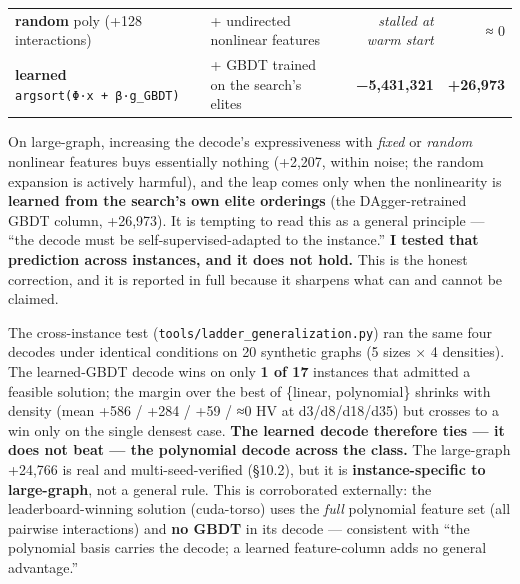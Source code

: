 \documentclass[
  11pt,
]{article}
\begin{document}
\begin{longtable}[]{@{}llrr@{}}
\begin{minipage}[t]{0.19\columnwidth}
\textbf{random} poly (+128 interactions)\strut
\end{minipage} & \begin{minipage}[t]{0.19\columnwidth}\raggedright
+ undirected nonlinear features\strut
\end{minipage} & \begin{minipage}[t]{0.25\columnwidth}\raggedleft
\emph{stalled at warm start}\strut
\end{minipage} & \begin{minipage}[t]{0.25\columnwidth}\raggedleft
≈ 0\strut
\end{minipage}\tabularnewline
\begin{minipage}[t]{0.19\columnwidth}\raggedright
\textbf{learned} \texttt{argsort(Φ·x\ +\ β·g\_GBDT)}\strut
\end{minipage} & \begin{minipage}[t]{0.19\columnwidth}\raggedright
+ GBDT trained on the search's elites\strut
\end{minipage} & \begin{minipage}[t]{0.25\columnwidth}\raggedleft
\textbf{−5,431,321}\strut
\end{minipage} & \begin{minipage}[t]{0.25\columnwidth}\raggedleft
\textbf{+26,973}\strut
\end{minipage}\tabularnewline
\bottomrule
\end{longtable}

On large-graph, increasing the decode's expressiveness with \emph{fixed}
or \emph{random} nonlinear features buys essentially nothing (+2,207,
within noise; the random expansion is actively harmful), and the leap
comes only when the nonlinearity is \textbf{learned from the search's
own elite orderings} (the DAgger-retrained GBDT column, +26,973). It is
tempting to read this as a general principle --- ``the decode must be
self-supervised-adapted to the instance.'' \textbf{I tested that
prediction across instances, and it does not hold.} This is the honest
correction, and it is reported in full because it sharpens what can and
cannot be claimed.

The cross-instance test (\texttt{tools/ladder\_generalization.py}) ran
the same four decodes under identical conditions on 20 synthetic graphs
(5 sizes × 4 densities). The learned-GBDT decode wins on only \textbf{1
of 17} instances that admitted a feasible solution; the margin over the
best of \{linear, polynomial\} shrinks with density (mean +586 / +284 /
+59 / ≈0 HV at d3/d8/d18/d35) but crosses to a win only on the single
densest case. \textbf{The learned decode therefore ties --- it does not
beat --- the polynomial decode across the class.} The large-graph
+24,766 is real and multi-seed-verified (§10.2), but it is
\textbf{instance-specific to large-graph}, not a general rule. This is
corroborated externally: the leaderboard-winning solution (cuda-torso)
uses the \emph{full} polynomial feature set (all pairwise interactions)
and \textbf{no GBDT} in its decode --- consistent with ``the polynomial
basis carries the decode; a learned feature-column adds no general
advantage.''
\end{document}
